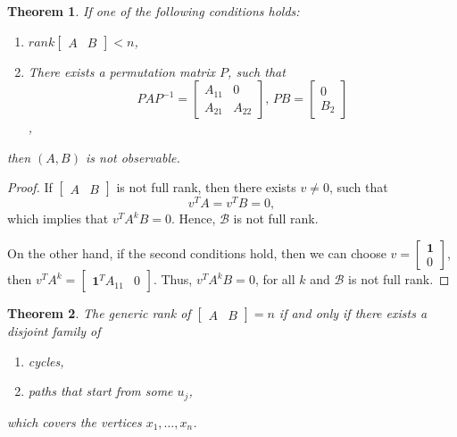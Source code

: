 \documentclass{article}
\newtheorem{theorem}{Theorem}
\begin{document}
\begin{theorem}
  If one of the following conditions holds:
  \begin{enumerate}
    \item $rank\begin{bmatrix} A & B\end{bmatrix} < n$, 
    \item There exists a permutation matrix $P$, such that
      \begin{displaymath}
	PAP^{-1} = \begin{bmatrix}
	  A_{11}& 0\\
	  A_{21}&A_{22}
	\end{bmatrix},\, PB = \begin{bmatrix}
	  0\\
	  B_2
	\end{bmatrix}
      \end{displaymath},
  \end{enumerate}
  then $(A,B)$ is not observable.
\end{theorem}
\begin{proof}
  If $\begin{bmatrix} A&B\end{bmatrix}$ is not full rank, then there exists $v\neq 0$, such that
    \begin{displaymath}
     v^TA = v^T B = 0, 
    \end{displaymath}
    which implies that $v^TA^k B = 0$. Hence, $\mathcal B$ is not full rank.

    On the other hand, if the second conditions hold, then we can choose $v = \begin{bmatrix} \mathbf 1 \\0  \end{bmatrix}$, then $v^TA^k = \begin{bmatrix} \mathbf 1^T A_{11} & 0\end{bmatrix}$. Thus, $v^TA^kB = 0$, for all $k$ and $\mathcal B$ is not full rank.
\end{proof}

\begin{theorem}
  The generic rank of $\begin{bmatrix} A&B\end{bmatrix} = n$ if and only if there exists a disjoint family of
    \begin{enumerate}
      \item cycles,
      \item paths that start from some $u_j$,
    \end{enumerate}
    which covers the vertices $x_1,\dots,x_n$.
\end{theorem}
\end{document}
